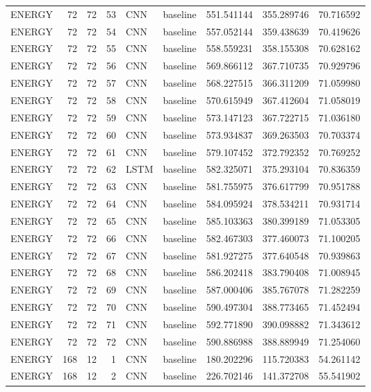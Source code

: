 \begin{table}
\begin{tabular}{lrrrllrrr}
ENERGY & 72 & 72 & 53 & CNN & baseline & 551.541144 & 355.289746 & 70.716592 \\
ENERGY & 72 & 72 & 54 & CNN & baseline & 557.052144 & 359.438639 & 70.419626 \\
ENERGY & 72 & 72 & 55 & CNN & baseline & 558.559231 & 358.155308 & 70.628162 \\
ENERGY & 72 & 72 & 56 & CNN & baseline & 569.866112 & 367.710735 & 70.929796 \\
ENERGY & 72 & 72 & 57 & CNN & baseline & 568.227515 & 366.311209 & 71.059980 \\
ENERGY & 72 & 72 & 58 & CNN & baseline & 570.615949 & 367.412604 & 71.058019 \\
ENERGY & 72 & 72 & 59 & CNN & baseline & 573.147123 & 367.722715 & 71.036180 \\
ENERGY & 72 & 72 & 60 & CNN & baseline & 573.934837 & 369.263503 & 70.703374 \\
ENERGY & 72 & 72 & 61 & CNN & baseline & 579.107452 & 372.792352 & 70.769252 \\
ENERGY & 72 & 72 & 62 & LSTM & baseline & 582.325071 & 375.293104 & 70.836359 \\
ENERGY & 72 & 72 & 63 & CNN & baseline & 581.755975 & 376.617799 & 70.951788 \\
ENERGY & 72 & 72 & 64 & CNN & baseline & 584.095924 & 378.534211 & 70.931714 \\
ENERGY & 72 & 72 & 65 & CNN & baseline & 585.103363 & 380.399189 & 71.053305 \\
ENERGY & 72 & 72 & 66 & CNN & baseline & 582.467303 & 377.460073 & 71.100205 \\
ENERGY & 72 & 72 & 67 & CNN & baseline & 581.927275 & 377.640548 & 70.939863 \\
ENERGY & 72 & 72 & 68 & CNN & baseline & 586.202418 & 383.790408 & 71.008945 \\
ENERGY & 72 & 72 & 69 & CNN & baseline & 587.000406 & 385.767078 & 71.282259 \\
ENERGY & 72 & 72 & 70 & CNN & baseline & 590.497304 & 388.773465 & 71.452494 \\
ENERGY & 72 & 72 & 71 & CNN & baseline & 592.771890 & 390.098882 & 71.343612 \\
ENERGY & 72 & 72 & 72 & CNN & baseline & 590.886988 & 388.889949 & 71.254060 \\
ENERGY & 168 & 12 & 1 & CNN & baseline & 180.202296 & 115.720383 & 54.261142 \\
ENERGY & 168 & 12 & 2 & CNN & baseline & 226.702146 & 141.372708 & 55.541902 \\

\end{tabular}
\end{table}
